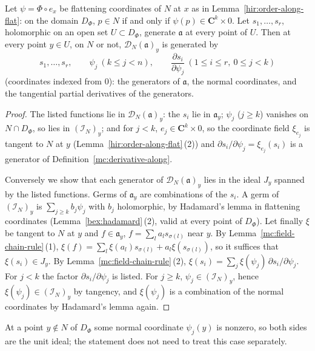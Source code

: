 \begin{proposition}
\label{mc:derivative-along-generators}
\leanok
Let \(\psi=\Phi\circ e_x\) be flattening coordinates of \(N\) at \(x\) as in Lemma~\ref{hir:order-along-flat}: on the domain \(D_\Phi\), \(p\in N\) if and only if
\(\psi(p)\in\mathbf C^k\times0\). Let \(s_1,\dots,s_r\), holomorphic on an open set \(U\subset D_\Phi\), generate \(\mathfrak a\) at every point of \(U\).
Then at every point \(y\in U\), on \(N\) or not, \(\mathcal D_N(\mathfrak a)_y\) is generated by
\[s_1,\dots,s_r,\qquad \psi_j\ (k\le j<n),\qquad \frac{\partial s_i}{\partial\psi_j}\ (1\le i\le r,\ 0\le j<k)\]
(coordinates indexed from \(0\)): the generators of \(\mathfrak a\), the normal coordinates, and the tangential partial derivatives of the generators.
\end{proposition}
\begin{proof}
\leanok
The listed functions lie in \(\mathcal D_N(\mathfrak a)_y\): the \(s_i\) lie in \(\mathfrak a_y\); \(\psi_j\) (\(j\ge k\)) vanishes on \(N\cap D_\Phi\), so lies in
\((\mathcal I_N)_y\); and for \(j<k\), \(e_j\in\mathbf C^k\times0\), so the coordinate field \(\xi_{e_j}\) is tangent to \(N\) at \(y\)
(Lemma~\ref{hir:order-along-flat}\,(2)) and \(\partial s_i/\partial\psi_j=\xi_{e_j}(s_i)\) is a generator of Definition~\ref{mc:derivative-along}.

Conversely we show that each generator of \(\mathcal D_N(\mathfrak a)_y\) lies in the ideal \(J_y\) spanned by the listed functions. Germs of \(\mathfrak a_y\) are
combinations of the \(s_i\). A germ of \((\mathcal I_N)_y\) is \(\sum_{j\ge k}b_j\psi_j\) with \(b_j\) holomorphic, by Hadamard's lemma in flattening coordinates
(Lemma~\ref{bex:hadamard}\,(2), valid at every point of \(D_\Phi\)). Let finally \(\xi\) be tangent to \(N\) at \(y\) and \(f\in\mathfrak a_y\), \(f=\sum_la_ls_{\sigma(l)}\)
near \(y\). By Lemma~\ref{mc:field-chain-rule}\,(1), \(\xi(f)=\sum_l\xi(a_l)s_{\sigma(l)}+a_l\xi(s_{\sigma(l)})\), so it suffices that \(\xi(s_i)\in J_y\). By
Lemma~\ref{mc:field-chain-rule}\,(2), \(\xi(s_i)=\sum_j\xi(\psi_j)\,\partial s_i/\partial\psi_j\). For \(j<k\) the factor \(\partial s_i/\partial\psi_j\) is listed. For
\(j\ge k\), \(\psi_j\in(\mathcal I_N)_y\), hence \(\xi(\psi_j)\in(\mathcal I_N)_y\) by tangency, and \(\xi(\psi_j)\) is a combination of the normal coordinates by
Hadamard's lemma again.
\end{proof}
At a point \(y\notin N\) of \(D_\Phi\) some normal coordinate \(\psi_j(y)\) is nonzero, so both sides are the unit ideal; the statement does not need to treat this case
separately.

